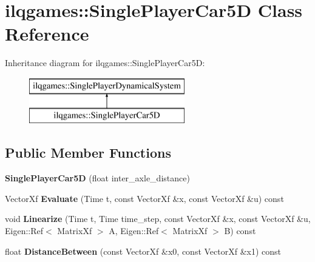 \hypertarget{classilqgames_1_1_single_player_car5_d}{}\section{ilqgames\+:\+:Single\+Player\+Car5D Class Reference}
\label{classilqgames_1_1_single_player_car5_d}
Inheritance diagram for ilqgames\+:\+:Single\+Player\+Car5D\+:\begin{figure}[H]
\begin{center}
\leavevmode
\includegraphics[height=2.000000cm]{classilqgames_1_1_single_player_car5_d}
\end{center}
\end{figure}
\subsection*{Public Member Functions}
\begin{DoxyCompactItemize}
\item 
{\bfseries Single\+Player\+Car5D} (float inter\+\_\+axle\+\_\+distance)\hypertarget{classilqgames_1_1_single_player_car5_d_aa2d4167f0643ec567c9b972027ef4097}{}\label{classilqgames_1_1_single_player_car5_d_aa2d4167f0643ec567c9b972027ef4097}

\item 
Vector\+Xf {\bfseries Evaluate} (Time t, const Vector\+Xf \&x, const Vector\+Xf \&u) const \hypertarget{classilqgames_1_1_single_player_car5_d_aec8946c18a72299e3b6fd01cb7eda35b}{}\label{classilqgames_1_1_single_player_car5_d_aec8946c18a72299e3b6fd01cb7eda35b}

\item 
void {\bfseries Linearize} (Time t, Time time\+\_\+step, const Vector\+Xf \&x, const Vector\+Xf \&u, Eigen\+::\+Ref$<$ Matrix\+Xf $>$ A, Eigen\+::\+Ref$<$ Matrix\+Xf $>$ B) const \hypertarget{classilqgames_1_1_single_player_car5_d_a9059f7965c8909944968d5445aee26b4}{}\label{classilqgames_1_1_single_player_car5_d_a9059f7965c8909944968d5445aee26b4}

\item 
float {\bfseries Distance\+Between} (const Vector\+Xf \&x0, const Vector\+Xf \&x1) const \hypertarget{classilqgames_1_1_single_player_car5_d_a1926a9e26bbca135158bf6e2f30c0fff}{}\label{classilqgames_1_1_single_player_car5_d_a1926a9e26bbca135158bf6e2f30c0fff}

\end{DoxyCompactItemize}
